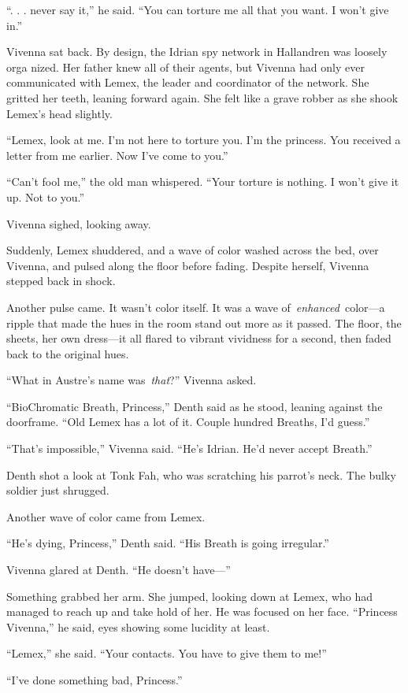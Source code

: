 “. . . never say it,” he said. “You can torture me all that you want. I won’t give in.”

Vivenna sat back. By design, the Idrian spy network in Hallandren was loosely orga nized. Her father knew all of their agents, but Vivenna had only ever communicated with Lemex, the leader and coordinator of the network. She gritted her teeth, leaning forward again. She felt like a grave robber as she shook Lemex’s head slightly.

“Lemex, look at me. I’m not here to torture you. I’m the princess. You received a letter from me earlier. Now I’ve come to you.”

“Can’t fool me,” the old man whispered. “Your torture is nothing. I won’t give it up. Not to you.”

Vivenna sighed, looking away.

Suddenly, Lemex shuddered, and a wave of color washed across the bed, over Vivenna, and pulsed along the floor before fading. Despite herself, Vivenna stepped back in shock.

Another pulse came. It wasn’t color itself. It was a wave of~\textit{enhanced}~color—a ripple that made the hues in the room stand out more as it passed. The floor, the sheets, her own dress—it all flared to vibrant vividness for a second, then faded back to the original hues.

“What in Austre’s name was~\textit{that}?” Vivenna asked.

“BioChromatic Breath, Princess,” Denth said as he stood, leaning against the doorframe. “Old Lemex has a lot of it. Couple hundred Breaths, I’d guess.”

“That’s impossible,” Vivenna said. “He’s Idrian. He’d never accept Breath.”

Denth shot a look at Tonk Fah, who was scratching his parrot’s neck. The bulky soldier just shrugged.

Another wave of color came from Lemex.

“He’s dying, Princess,” Denth said. “His Breath is going irregular.”

Vivenna glared at Denth. “He doesn’t have—”

Something grabbed her arm. She jumped, looking down at Lemex, who had managed to reach up and take hold of her. He was focused on her face. “Princess Vivenna,” he said, eyes showing some lucidity at least.

“Lemex,” she said. “Your contacts. You have to give them to me!”

“I’ve done something bad, Princess.”

